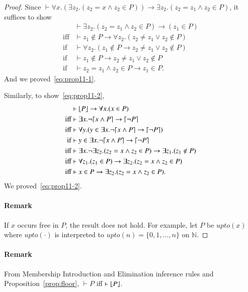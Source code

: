 \documentclass{article}
\theoremstyle{plain}
\DeclarePairedDelimiter\ceil{\lceil}{\rceil}
\DeclarePairedDelimiter\floor{\lfloor}{\rfloor}
\begin{document}
\begin{proof}
Since $\vdash \forall x . (\exists z_2 . (z_2 = x \wedge z_2 \in P)) \to \exists z_2 . (z_2 = z_1 \wedge z_2 \in P) $, it suffices to show
\begin{align*}
&\vdash \exists z_2 . (z_2 = z_1 \wedge z_2 \in P) \to (z_1 \in P) \\
{\text{iff}}& \vdash z_1 \not \in P \to \forall z_2 . (z_2 \neq z_1 \vee z_2 \not \in P) \\
{\text{if}}& \vdash \forall z_2 . (z_1 \not \in P \to z_2 \neq z_1 \vee z_2 \not \in P) \\
{\text{if}}& \vdash z_1 \not \in P \to z_2 \neq z_1 \vee z_2 \not \in P \\
{\text{if}}& \vdash z_2 = z_1 \wedge z_2 \in P \to z_1 \in P.
\end{align*}
And we proved~\eqref{eq:prop11-1}.

Similarly, to show~\eqref{eq:prop11-2}, 
\begin{align*}
&\vdash \floor*{P} \to \forall x . (x \in P)  \\
{\text{iff}}& \vdash \exists x . \neg \ceil*{x \wedge P} \to \ceil*{\neg P} \\
{\text{iff}}& \vdash \forall y . (y \in \exists x . \neg \ceil*{x \wedge P} \to \ceil*{\neg P}) \\
{\text{if}}& \vdash y \in \exists x . \neg \ceil*{x \wedge P} \to \ceil*{\neg P} \\
{\text{iff}}& \vdash \exists x . \neg \exists z_2 . (z_2 = x \wedge z_2 \in P) \to \exists z_1 . (z_1 \not \in P) \\
{\text{iff}}& \vdash \forall z_1 . (z_1 \in P) \to \exists z_2 . (z_2 = x \wedge z_2 \in P)\\
{\text{iff}}& \vdash x \in P \to \exists z_2 . (z_2 = x \wedge z_2 \in P).
\end{align*}
We proved~\eqref{eq:prop11-2}.

\paragraph{Remark} If $x$ occurs free in $P$, the result does not hold. For example, let $P$ be $upto(x)$ where $upto(\cdot)$ is interpreted to $upto(n) = \{0, 1, \dots, n\}$ on $\mathbb{N}$. 
\end{proof}

\paragraph{Remark} From Membership Introduction and Elimination inference rules and Proposition~\ref{prop:floor}, $\vdash P$ iff $\vdash \floor*{P}$.
\end{document}
